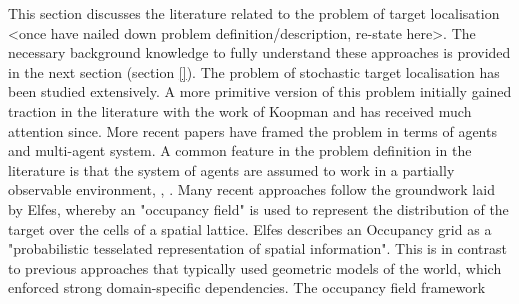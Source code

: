 


This section discusses the literature related to the problem of target localisation <once have nailed down problem definition/description, re-state here>. The necessary background knowledge to fully understand these approaches is provided in the next section (section \ref{}).
The problem of stochastic target localisation has been studied extensively. A more primitive version of this problem initially gained traction in the literature with the work of Koopman \cite{KoopmanTheoryOfSearchTargetDetection} and has received much attention since. More recent papers have framed the problem in terms of agents and multi-agent system. %
A common feature in the problem definition in the literature is that the system of agents are assumed to work in a partially observable environment\cite{Symington2010ProbabilisticRAVs}, \cite{Chung2008Multi-agentFramework}, \cite{WongMulti-vehicleTargets}. Many recent approaches follow the groundwork laid by Elfes\cite{ElfesUsingNavigation}, whereby an "occupancy field" is used to represent the distribution of the target over the cells of a spatial lattice. Elfes describes an Occupancy grid as a "probabilistic tesselated representation of spatial information". This is in contrast to previous approaches that typically used geometric models of the world, which enforced strong domain-specific dependencies. The occupancy field framework 
\par